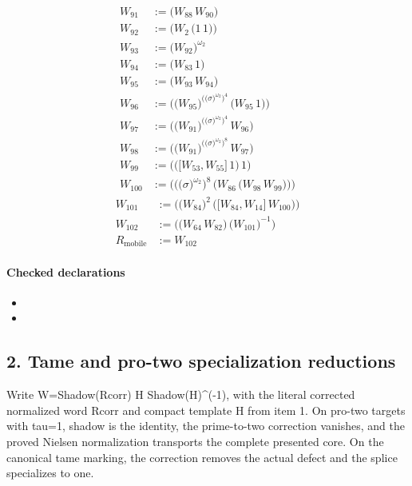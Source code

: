 \begin{align*}
W_{91} &:= \bigl(W_{88}\,W_{90}\bigr) \\
W_{92} &:= \bigl(W_{2}\,\bigl(1\,1\bigr)\bigr) \\
W_{93} &:= \bigl(W_{92}\bigr)^{\omega_2} \\
W_{94} &:= \bigl(W_{83}\,1\bigr) \\
W_{95} &:= \bigl(W_{93}\,W_{94}\bigr) \\
W_{96} &:= \bigl(\bigl(W_{95}\bigr)^{\bigl(\bigl(\sigma\bigr)^{\omega_2}\bigr)^{4}}\,\bigl(W_{95}\,1\bigr)\bigr) \\
W_{97} &:= \bigl(\bigl(W_{91}\bigr)^{\bigl(\bigl(\sigma\bigr)^{\omega_2}\bigr)^{4}}\,W_{96}\bigr) \\
W_{98} &:= \bigl(\bigl(W_{91}\bigr)^{\bigl(\bigl(\sigma\bigr)^{\omega_2}\bigr)^{8}}\,W_{97}\bigr) \\
W_{99} &:= \bigl(\bigl(\bigl[W_{53},W_{55}\bigr]\,1\bigr)\,1\bigr) \\
W_{100} &:= \bigl(\bigl(\bigl(\sigma\bigr)^{\omega_2}\bigr)^{8}\,\bigl(W_{86}\,\bigl(W_{98}\,W_{99}\bigr)\bigr)\bigr)
\end{align*}
\begin{align*}
W_{101} &:= \bigl(\bigl(W_{84}\bigr)^{2}\,\bigl(\bigl[W_{84},W_{14}\bigr]\,W_{100}\bigr)\bigr) \\
W_{102} &:= \bigl(\bigl(W_{64}\,W_{82}\bigr)\,\bigl(W_{101}\bigr)^{-1}\bigr) \\
R_{\mathrm{mobile}} &:= W_{102}
\end{align*}

\paragraph{Checked declarations}
\begin{itemize}
\item {}
\item {}
\end{itemize}

\subsection*{2. Tame and pro-two specialization reductions}
Write W=Shadow(Rcorr) H Shadow(H)\textasciicircum{}(-1), with the literal corrected normalized word Rcorr and compact template H from item 1. On pro-two targets with tau=1, shadow is the identity, the prime-to-two correction vanishes, and the proved Nielsen normalization transports the complete presented core. On the canonical tame marking, the correction removes the actual defect and the splice specializes to one.

